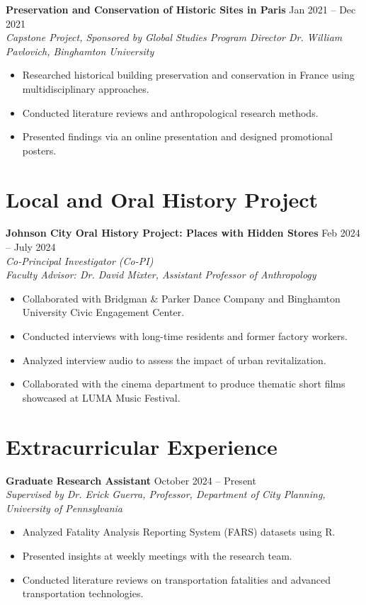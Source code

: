 \documentclass[11pt]{article}
\begin{document}
\noindent
\textbf{Preservation and Conservation of Historic Sites in Paris} \hfill Jan 2021 -- Dec 2021 \\
\textit{Capstone Project, Sponsored by Global Studies Program Director Dr. William Pavlovich, Binghamton University}
\begin{itemize}[leftmargin=*]
    \item Researched historical building preservation and conservation in France using multidisciplinary approaches.
    \item Conducted literature reviews and anthropological research methods.
    \item Presented findings via an online presentation and designed promotional posters.
\end{itemize}

\section*{Local and Oral History Project}
\noindent
\textbf{Johnson City Oral History Project: Places with Hidden Stores} \hfill Feb 2024 -- July 2024 \\
\textit{Co-Principal Investigator (Co-PI) \\
Faculty Advisor: Dr. David Mixter, Assistant Professor of Anthropology}
\begin{itemize}[leftmargin=*]
    \item Collaborated with Bridgman \& Parker Dance Company and Binghamton University Civic Engagement Center.
    \item Conducted interviews with long-time residents and former factory workers.
    \item Analyzed interview audio to assess the impact of urban revitalization.
    \item Collaborated with the cinema department to produce thematic short films showcased at LUMA Music Festival.
\end{itemize}

\section*{Extracurricular Experience}
\noindent
\textbf{Graduate Research Assistant} \hfill October 2024 -- Present \\
\textit{Supervised by Dr. Erick Guerra, Professor, Department of City Planning, University of Pennsylvania}
\begin{itemize}[leftmargin=*]
    \item Analyzed Fatality Analysis Reporting System (FARS) datasets using R.
    \item Presented insights at weekly meetings with the research team.
    \item Conducted literature reviews on transportation fatalities and advanced transportation technologies.
\end{itemize}
\end{document}
